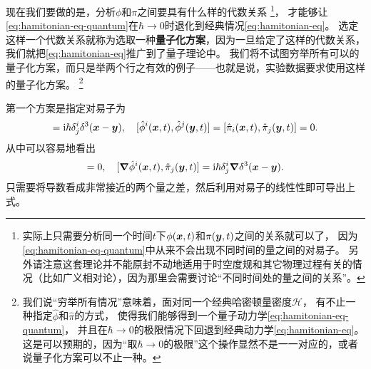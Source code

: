 \documentclass[UTF8, a4paper]{ctexart}
\newcommand*{\ii}{\mathrm{i}}
\begin{document}
现在我们要做的是，分析$\phi$和$\pi$之间要具有什么样的代数关系%
\footnote{实际上只需要分析同一个时间$t$下$\phi(\vb*{x}, t)$和$\pi(\vb*{y}, t)$之间的关系就可以了，
因为\eqref{eq:hamitonian-eq-quantum}中从来不会出现不同时间的量之间的对易子。
另外请注意这套理论并不能原封不动地适用于时空度规和其它物理过程有关的情况（比如广义相对论），因为那里会需要讨论“不同时间处的量之间的关系”。}，
才能够让\eqref{eq:hamitonian-eq-quantum}在$\hbar \to 0$时退化到经典情况\eqref{eq:hamitonian-eq}。
选定这样一个代数关系就称为选取一种\textbf{量子化方案}，因为一旦给定了这样的代数关系，我们就把\eqref{eq:hamitonian-eq}推广到了量子理论中。
我们将不试图穷举所有可以的量子化方案，而只是举两个行之有效的例子——也就是说，实验数据要求使用这样的量子化方案。%
\footnote{我们说“穷举所有情况”意味着，面对同一个经典哈密顿量密度$\mathcal{H}$，
有不止一种指定$\hat{\phi}$和$\hat{\pi}$的方式，
使得我们能够得到一个量子动力学\eqref{eq:hamitonian-eq-quantum}，
并且在$\hbar \to 0$的极限情况下回退到经典动力学\eqref{eq:hamitonian-eq}。
这是可以预期的，因为“取$\hbar\to 0$的极限”这个操作显然不是一一对应的，或者说量子化方案可以不止一种。
}

第一个方案是指定对易子为
\begin{equation}
    [\hat{\phi}^i(\vb*{x}, t), \hat{\pi}_j(\vb*{y}, t)] = \ii \hbar \delta^i_j \delta^3(\vb*{x} - \vb*{y}), 
    \quad [\hat{\phi}^i(\vb*{x}, t), \hat{\phi}^j(\vb*{y}, t)] = [\hat{\pi}_i(\vb*{x}, t), \hat{\pi}_j(\vb*{y}, t)] = 0.
    \label{eq:symmetry-commutator}
\end{equation}
从中可以容易地看出
\begin{equation}
    [\partial_\mu \hat{\phi}^i(\vb*{x}, t), \hat{\phi}^j(\vb*{y}, t)] = 0, 
    \quad [\grad{\hat{\phi}^i(\vb*{x}, t)}, \hat{\pi}_j(\vb*{y}, t)] = \ii \hbar \delta^i_j \grad{\delta^3(\vb*{x} - \vb*{y})}.
    \label{eq:symmetry-partial-mu-commutator}
\end{equation}
只需要将导数看成非常接近的两个量之差，然后利用对易子的线性性即可导出上式。
\end{document}
